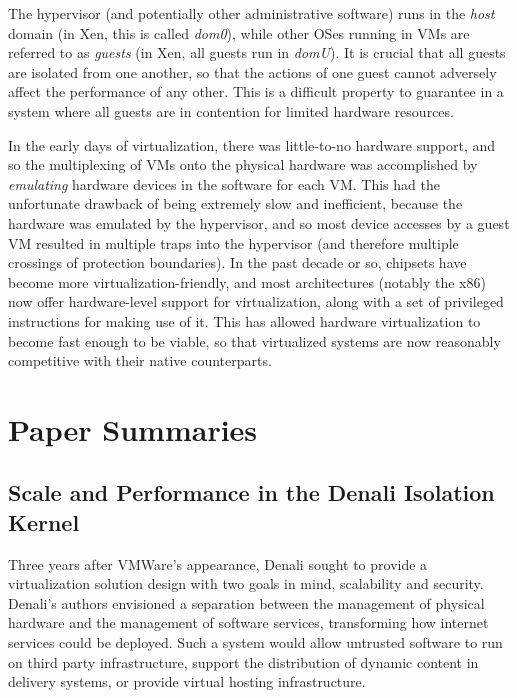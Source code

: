 \documentclass[letterpaper, twocolumn]{article}
\begin{document}
The hypervisor (and potentially other administrative software) runs in the \emph{host}
domain (in Xen, this is called \emph{dom0}), while other OSes running in VMs are 
referred to as \emph{guests} (in Xen, all guests run in \emph{domU}).  It is
crucial that all guests are isolated from one another, so that the actions of one guest
cannot adversely affect the performance of any other.  This is a difficult property
to guarantee in a system where all guests are in contention for limited hardware resources.

In the early days of virtualization, there was little-to-no hardware support,
and so the multiplexing of VMs onto the physical hardware was accomplished by
\emph{emulating} hardware devices in the software for each VM.  This had the unfortunate
drawback of being extremely slow and inefficient, because the hardware was emulated by
the hypervisor, and so most device accesses by a guest VM resulted in multiple traps
into the hypervisor (and therefore multiple crossings of protection boundaries).
In the past decade or so, chipsets have become more virtualization-friendly,
and most architectures (notably the x86) now offer hardware-level support for
virtualization, along with a set of privileged instructions for making use of it.
This has allowed hardware virtualization to become fast enough to be viable,
so that virtualized systems are now reasonably competitive with their native
counterparts.

\section{Paper Summaries}
\label{sec:summaries}

\subsection{Scale and Performance in the Denali Isolation Kernel}
\label{sec:summaries/denali}

Three years after VMWare's appearance, Denali \cite{ref:denali} sought to provide a virtualization
solution design with two goals in mind, scalability and security. Denali's authors
envisioned a separation between the management of physical hardware and the management
of software services, transforming how internet services could be deployed. Such a system 
would allow untrusted software to run on third party infrastructure, support the distribution 
of dynamic content in delivery systems, or provide virtual hosting infrastructure.
\end{document}
